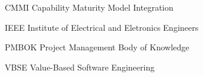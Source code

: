 \begin{siglas}
  \item CMMI Capability Maturity Model Integration
  \item IEEE Institute of Electrical and Eletronics Engineers
  \item PMBOK Project Management Body of Knowledge
  \item VBSE Value-Based Software Engineering
\end{siglas}
